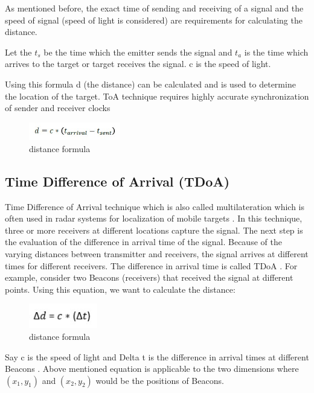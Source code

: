 As mentioned before, the exact time of sending and receiving of a signal and the speed of signal (speed of light is considered) are requirements for calculating the distance.\cite{brian17}

Let the $t_s$ be the time which the emitter sends the signal and $t_a$ is the time which arrives to the target or target receives the signal. c is the speed of light.

Using this formula d (the distance) can be calculated and is used to determine the location of the target. ToA technique requires highly accurate synchronization of sender and receiver clocks \cite{jin18}



\begin{figure}[htp]
	\centering
	\includegraphics[width=4cm]{3.jpg}
	\caption{distance formula \cite{jin18}}
	\label{fig:Localization}
\end{figure}



\subsection{Time Difference of Arrival (TDoA)}
Time Difference of Arrival technique which is also called multilateration which is often used in radar systems for localization of mobile targets \cite{schaefer15}. In this technique, three or more receivers at different locations capture the signal. The next step is the evaluation of the difference in arrival time of the signal. Because of the varying distances between transmitter and receivers, the signal arrives at different times for different receivers. The difference in arrival time is called TDoA \cite{brian17}.
For example, consider two Beacons (receivers) that received the signal at different points. Using this equation, we want to calculate the distance:

\begin{figure}[htp]
    \centering
    \includegraphics[width=3cm]{4.jpg}
    \caption{distance formula \cite{jin18}}
    \label{fig:formula}
\end{figure}

Say c is the speed of light and Delta t is the difference in arrival times at different Beacons \cite{schaefer18}. Above mentioned equation is applicable to the two dimensions where $(x_1,y_1)$ and $(x_2,y_2)$ would be the positions of Beacons.



